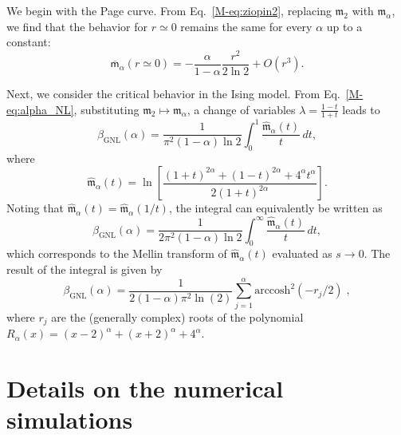 \documentclass[aps,prl,twocolumn,superscriptaddress,reprint,longbibliography,nofootinbib]{revtex4-2}
\begin{document}
We begin with the Page curve. From Eq.~\eqref{M-eq:ziopin2}, replacing $\mathfrak{m}_2$ with $\mathfrak{m}_\alpha$, we find that the behavior for $r \simeq 0$ remains the same for every $\alpha$ up to a constant:
\begin{equation}
\overline{\mathsf{m}}_\alpha(r \simeq 0) = - \frac{\alpha}{1-\alpha} \frac{r^2}{2 \ln 2} + O(r^3).
\end{equation}

Next, we consider the critical behavior in the Ising model. From Eq.~\eqref{M-eq:alpha_NL}, substituting $\mathfrak{m}_2 \mapsto \mathfrak{m}_\alpha$, a change of variables $\lambda = \frac{1-t}{1+t}$ leads to
\begin{equation}
\beta_{\mathrm{GNL}}(\alpha) = \frac{1}{\pi^2 (1-\alpha) \ln 2} \int_0^1 \frac{\hat{\mathfrak{m}}_\alpha(t)}{t}\, dt,
\end{equation}
where
\begin{equation}
\hat{\mathfrak{m}}_\alpha(t) = \ln \left[ \frac{(1+t)^{2\alpha} + (1-t)^{2\alpha} + 4^\alpha t^\alpha}{2 (1+t)^{2\alpha}} \right].
\end{equation}
Noting that $\hat{\mathfrak{m}}_\alpha(t) = \hat{\mathfrak{m}}_\alpha(1/t)$, the integral can equivalently be written as
\begin{equation}
\beta_{\mathrm{GNL}}(\alpha) = \frac{1}{2 \pi^2 (1-\alpha) \ln 2} \int_0^\infty \frac{\hat{\mathfrak{m}}_\alpha(t)}{t}\, dt,
\end{equation} 
which corresponds to the Mellin transform of $\hat{\mathfrak{m}}_\alpha(t)$ evaluated as $s \to 0$.
The result of the integral is given by 
\begin{equation}
\beta_{\mathrm{GNL}}(\alpha) = \frac{1}{2 (1-\alpha) \pi^2 \ln(2)}\sum_{j=1}^\alpha \mathrm{arccosh}^2(-r_j/2)\;,
\end{equation}
where $r_j$ are the (generally complex) roots of the polynomial $R_\alpha(x)=(x-2)^\alpha+(x+2)^\alpha+4^\alpha$.

\section{Details on the numerical simulations}
\label{app:numerics}
\end{document}
